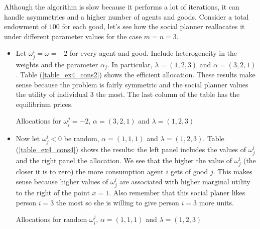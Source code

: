 \documentclass[a4paper,12pt]{article}
\begin{document}
    Although the algorithm is slow because it performs a lot of iterations, it can handle asymmetries and a higher number of agents and goods. Consider a total endowment of $100$ for each good, let's see how the social planner reallocates it under different parameter values for the case $m=n=3$. 
    
    \begin{itemize}
        \item Let $\omega_j^i = \omega = -2$ for every agent and good. Include heterogeneity in the weights and the parameter $\alpha_j$. In particular, $\lambda = (1,2,3)$ and $\alpha = (3,2,1)$. Table (\ref{table_ex4_cons2}) shows the efficient allocation. These results make sense because the problem is fairly symmetric and the social planner values the utility of individual $3$ the most. The last column of the table has the equilibrium prices.  
        
        \begin{table}[!htbp]
            \centering
            \caption[Short Caption for LoT]{Allocations for $\omega_i^j=-2$, $\alpha=(3,2,1)$ and $\lambda=(1,2,3)$}\label{table_ex4_cons2}
        \end{table}
        
        \item Now let $\omega_j^i<0$ be random, $\alpha = (1,1,1)$ and $\lambda = (1,2,3)$. Table (\ref{table_ex4_cons4}) shows the results: the left panel includes the values of $\omega_j^i$ and the right panel the allocation. We see that the higher the value of $\omega_j^i$ (the closer it is to zero) the more consumption agent $i$ gets of good $j$. This makes sense because higher values of $\omega_j^i$ are associated with higher marginal utility to the right of the point $x=1$. Also remember that this social planer likes person $i=3$ the most so she is willing to give person $i=3$ more units. 
        
        \begin{table}[!htbp]
            \centering
            \small
            \caption[Short Caption for LoT]{Allocations for random $\omega_i^j$, $\alpha=(1,1,1)$ and $\lambda=(1,2,3)$}\label{table_ex4_cons4}
             
            
        \end{table}
        
        
    \end{itemize}
    
\end{document}
